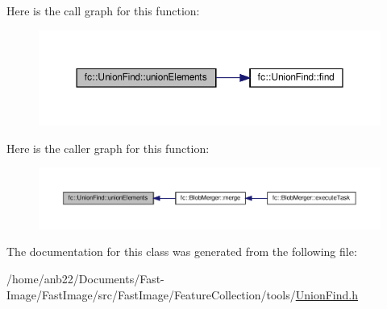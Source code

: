 Here is the call graph for this function\+:
\nopagebreak
\begin{figure}[H]
\begin{center}
\leavevmode
\includegraphics[width=350pt]{dd/d13/classfc_1_1UnionFind_af2a4f58739f658a16006fb023a6fa9fc_cgraph}
\end{center}
\end{figure}
Here is the caller graph for this function\+:
\nopagebreak
\begin{figure}[H]
\begin{center}
\leavevmode
\includegraphics[width=350pt]{dd/d13/classfc_1_1UnionFind_af2a4f58739f658a16006fb023a6fa9fc_icgraph}
\end{center}
\end{figure}


The documentation for this class was generated from the following file\+:\begin{DoxyCompactItemize}
\item 
/home/anb22/\+Documents/\+Fast-\/\+Image/\+Fast\+Image/src/\+Fast\+Image/\+Feature\+Collection/tools/\hyperlink{UnionFind_8h}{Union\+Find.\+h}\end{DoxyCompactItemize}
